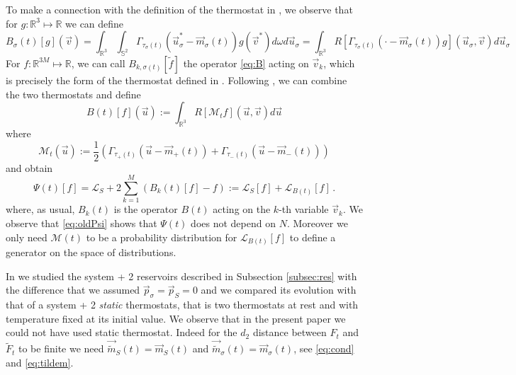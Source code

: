 \documentclass{article}
\newcommand*\R{ \mathds{R} }
\newcommand*\cL{ \mathcal{L} }
\newcommand\vv{{\vec v}}
\newcommand\vu{{\vec u}}
\begin{document}
To make a connection with the definition of the thermostat in \cite{BLTV,BLP25}, we observe that for 
$g:\R^3\mapsto\R$ we can define
%
\begin{equation}\label{eq:B}
B_\sigma(t)[g](\vv)=\int_{\R^3}\int_{\mathds S^2} \Gamma_{\tau_\sigma(t)}(\vu^*_\sigma-\vec m_\sigma(t))g(\vv^*)d\omega 
d\vu_\sigma=
\int_{\R^3} R[\Gamma_{\tau_\sigma(t)}(\cdot-\vec m_\sigma(t))g](\vu_\sigma,\vv)d\vu_\sigma
\end{equation}
%
For $f:\R^{3M}\mapsto \R$, we can call $B_{k,\sigma(t)}[\tilde f]$ the operator \eqref{eq:B} acting on $\vv_k$,
which is precisely the form of the thermostat defined in \cite{BLTV,BLP25}. Following \cite{CLM}, we can combine
the two thermostats and define
\begin{equation}\label{eq:BM}
B(t)[f](\vu):=\int_{\R^3} R[\mathcal M_tf](\vu,\vv)d\vu
\end{equation}
where
\[
\mathcal M_t(\vu):=\frac 12\left(\Gamma_{\tau_+(t)}(\vu-\vec m_+(t))+\Gamma_{\tau_-(t)}(\vu-\vec 
m_-(t))\right)
\]
and obtain
\begin{equation}\label{eq:oldPsi}
\Psi(t)[f] = \cL_S + 2\sum_{k=1}^M (B_{k}(t)[f] - f):=\cL_S[f] + \cL_{B(t)}[f]\, .
\end{equation}
where, as usual, $B_k(t)$ is the operator $B(t)$ acting on the $k$-th variable $\vv_k$. We observe that
\eqref{eq:oldPsi} shows that $\Psi(t)$ does not depend on $N$. Moreover we only need $\mathcal M(t)$ to be a probability
distribution for $\cL_{B(t)}[f]$ to define a generator on the space of distributions.

In \cite{BLP25} we studied the system + 2 reservoirs described in Subsection \ref{subsec:res} with the difference that
we assumed $\vec p_\sigma=\vec p_S=0$ and we compared its evolution with that of a system + 2 {\it static} thermostats,
that is two thermostats at rest and with temperature fixed at its initial value. We observe that in the present paper we
could not have used static thermostat. Indeed  for the $d_2$ distance between $F_t$ and $\widetilde F_t$ to be finite we
need $\vec {\tilde m}_S(t)=\vec m_S(t)$ and $\vec {\tilde m}_\sigma(t)=\vec m_\sigma(t)$, see \eqref{eq:cond} and
\eqref{eq:tildem}.
\end{document}
